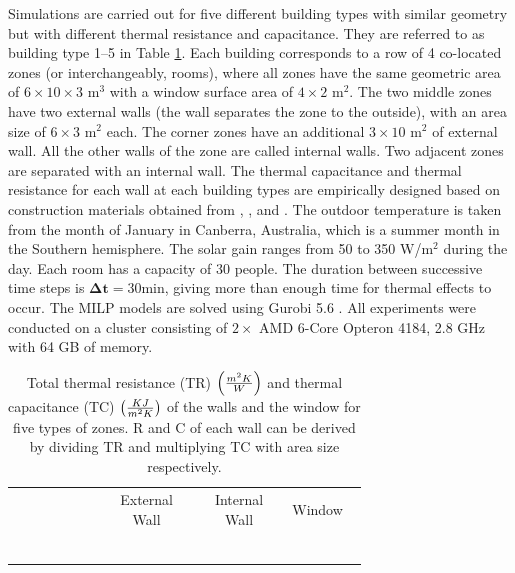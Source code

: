 Simulations are carried out for five different building types with similar geometry but with different thermal resistance and capacitance. They are referred to as building type 1--5 in Table \ref{tab:rc_wall_win}. Each building corresponds to a row of 4 co-located zones (or interchangeably, rooms), where all zones have the same geometric area of $6\times 10\times 3 \mbox{ m}^3$ with a window surface area of $4\times 2    \mbox{ m}^2$. The two middle zones have two external walls (the wall separates the zone to the outside), with an area size of $6\times 3 \mbox{ m}^2$ each. The corner zones have an additional $3\times 10 \mbox{ m}^2$ of external wall. All the other walls of the zone are called internal walls. Two adjacent zones are separated with an internal wall. The thermal capacitance and thermal resistance for each wall at each building types are empirically designed based on construction materials obtained from \cite{gouda2000low}, \cite{gouda2002building}, \cite{goyal2013occupancy} and \cite{ashrae2013fund}. The outdoor temperature is taken from the month of January in Canberra, Australia, which is a summer month in the Southern hemisphere. The solar gain ranges from 50 to 350 W/m$^2$ during the day. Each room has a capacity of 30 people. The duration between successive time steps is $\bm{\Delta t} = 30$min, giving more than enough time for thermal effects to occur.  The MILP models are solved using Gurobi 5.6 \citep{gurobi}. All experiments were conducted on a cluster consisting of $2\times$ AMD 6-Core Opteron 4184, 2.8 GHz with 64 GB of memory.

\begin{table}[t]
\centering
\begin{tabular}{p{0.2\linewidth} p{0.1\linewidth} p{0.1\linewidth}  p{0.1\linewidth} p{0.1\linewidth} p{0.1\linewidth}}
\hline\centering{Building Types} & \multicolumn{2}{c}{External Wall} & \multicolumn{2}{c}{Internal Wall} & {Window} \tabularnewline
       & \centering{(TR)} & \centering{(TC)} & \centering{(TR)} & \centering{(TC)} & \centering{(TR)} \tabularnewline
\hline \centering{1 (LRLC)} & \centering{3} & \centering{120} & \centering{1.5} & \centering{120} & \centering{0.5} \tabularnewline
\hline \centering{2 (MRMC)} & \centering{3} & \centering{140} & \centering{1.5} & \centering{140} & \centering{0.5} \tabularnewline
\hline \centering{3 (LRHC)} & \centering{3} & \centering{240} & \centering{1.5} & \centering{240} & \centering{0.5} \tabularnewline
\hline \centering{4 (HRLC)} & \centering{6} & \centering{120} & \centering{3} & \centering{120} & \centering{0.5} \tabularnewline
\hline \centering{5 (HRHC)} & \centering{6} & \centering{240} & \centering{3} & \centering{240} & \centering{0.5} \tabularnewline
\end{tabular}
	\caption{Total thermal resistance (TR) $\left( m^2 K\over W\right)$ and thermal capacitance (TC) $\left( KJ \over m^2K \right)$ of the walls and the window for five types of zones. R and C of each wall can be derived by dividing TR and multiplying TC with area size respectively.}
	\label{tab:rc_wall_win}
\end{table}


